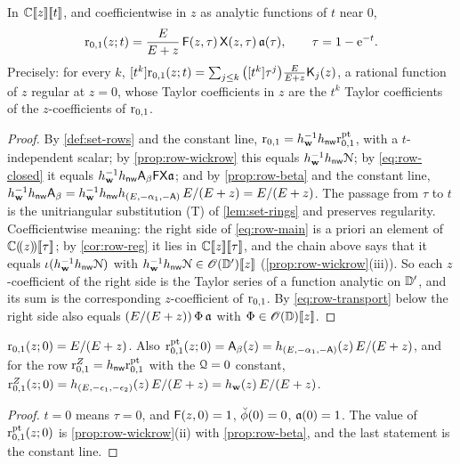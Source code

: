 \begin{thm}
\label{thm:row-main}
In $\mathbb{C}[\![ z ]\!][\![ t ]\!]$, and coefficientwise in $z$ as analytic functions of $t$ near $0$,
\begin{equation}
\label{eq:row-main}
\mathrm{r}_{0,1}(z;t)=\frac{E}{E+z}\,\mathsf{F}(z,\tau)\,\mathsf{X}(z,\tau)\,\mathfrak{a}(\tau),\qquad \tau=1-\mathrm{e}^{-t}.
\end{equation}
Precisely: for every $k$, $[t^k]\mathrm{r}_{0,1}(z;t)=\sum_{j\leq k}\big([t^k]\tau^j\big)\frac{E}{E+z}\mathsf{K}_j(z)$, a rational function of $z$ regular at $z=0$, whose Taylor coefficients in $z$ are the $t^k$ Taylor coefficients of the $z$-coefficients of $\mathrm{r}_{0,1}$.
\end{thm}

\begin{proof}
By \cref{def:set-rows} and the constant line, $\mathrm{r}_{0,1}=h_{\mathbf{w}}^{-1}h_{\mathsf{nw}}\mathrm{r}^{\mathrm{pt}}_{0,1}$, with a $t$-independent scalar; by \cref{prop:row-wickrow} this equals $h_{\mathbf{w}}^{-1}h_{\mathsf{nw}}\mathcal{N}$; by \eqref{eq:row-closed} it equals $h_{\mathbf{w}}^{-1}h_{\mathsf{nw}}\mathsf{A}_{\beta}\mathsf{F}\mathsf{X}\mathfrak{a}$; and by \cref{prop:row-beta} and the constant line, $h_{\mathbf{w}}^{-1}h_{\mathsf{nw}}\mathsf{A}_{\beta}=h_{\mathbf{w}}^{-1}h_{\mathsf{nw}} h_{(E,-\alpha_1,-\mathsf{A})}\,E/(E+z)=E/(E+z)$. The passage from $\tau$ to $t$ is the unitriangular substitution (T) of \cref{lem:set-rings} and preserves regularity. Coefficientwise meaning: the right side of \eqref{eq:row-main} is a priori an element of $\mathbb{C}(\!(z)\!)[\![ \tau ]\!]$; by \cref{cor:row-reg} it lies in $\mathbb{C}[\![ z ]\!][\![ \tau ]\!]$, and the chain above says that it equals $\iota(h_{\mathbf{w}}^{-1}h_{\mathsf{nw}}\mathcal{N})$ with $h_{\mathbf{w}}^{-1}h_{\mathsf{nw}}\mathcal{N}\in\mathscr{O}(\mathbb{D}')[\![ z ]\!]$ (\cref{prop:row-wickrow}(iii)). So each $z$-coefficient of the right side is the Taylor series of a function analytic on $\mathbb{D}'$, and its sum is the corresponding $z$-coefficient of $\mathrm{r}_{0,1}$. By \eqref{eq:row-transport} below the right side also equals $(E/(E+z))\,\Phi\,\mathfrak{a}$ with $\Phi\in\mathscr{O}(\mathbb{D})[\![ z ]\!]$.
\end{proof}

\begin{cor}[(F2) at $t=0$]
\label{cor:row-F2}
$\mathrm{r}_{0,1}(z;0)=E/(E+z)$. Also $\mathrm{r}^{\mathrm{pt}}_{0,1}(z;0)=\mathsf{A}_{\beta}(z)=h_{(E,-\alpha_1,-\mathsf{A})}(z)\,E/(E+z)$, and for the row $\mathrm{r}^{Z}_{0,1}=h_{\mathsf{nw}}\mathrm{r}^{\mathrm{pt}}_{0,1}$ with the $\mathcal{Q}=0$ constant, $\mathrm{r}^{Z}_{0,1}(z;0)=h_{(E,-\epsilon_1,-\epsilon_2)}(z)\,E/(E+z)=h_{\mathbf{w}}(z)\,E/(E+z)$.
\end{cor}

\begin{proof}
$t=0$ means $\tau=0$, and $\mathsf{F}(z,0)=1$, $\breve{\phi}(0)=0$, $\mathfrak{a}(0)=1$. The value of $\mathrm{r}^{\mathrm{pt}}_{0,1}(z;0)$ is \cref{prop:row-wickrow}(ii) with \cref{prop:row-beta}, and the last statement is the constant line.
\end{proof}

